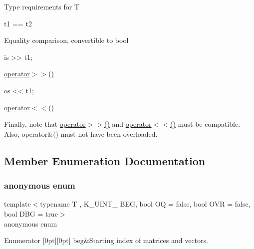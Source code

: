\begin{DoxyParagraph}{Type requirements for T}
\begin{DoxyItemize}
\item 
\begin{DoxyCode}
t1 == t2 
\end{DoxyCode}
 Equality comparison, convertible to {\ttfamily bool} 
\item 
\begin{DoxyCode}
is >> t1; 
\end{DoxyCode}
 {\ttfamily \mbox{\hyperlink{namespaceKalman_a72ce00e837fa126ab3961f879e3d8b87}{operator$>$$>$()}}} 
\item 
\begin{DoxyCode}
os << t1; 
\end{DoxyCode}
 {\ttfamily \mbox{\hyperlink{namespaceKalman_a531684dadbec9b34313492f6d5121598}{operator$<$$<$()}}} 
\end{DoxyItemize}
\end{DoxyParagraph}
Finally, note that {\ttfamily \mbox{\hyperlink{namespaceKalman_a72ce00e837fa126ab3961f879e3d8b87}{operator$>$$>$()}}} and {\ttfamily \mbox{\hyperlink{namespaceKalman_a531684dadbec9b34313492f6d5121598}{operator$<$$<$()}}} must be compatible. Also, {\ttfamily operator\&()} must not have been overloaded. 

\subsection{Member Enumeration Documentation}
\mbox{\label{classKalman_1_1EKFilter_a0665fa7fa760b5235cb556e2503ff687}} 
\subsubsection{\texorpdfstring{anonymous enum}{anonymous enum}}
{\footnotesize\ttfamily template$<$typename T , K\+\_\+\+U\+I\+N\+T\+\_ B\+EG, bool OQ = false, bool O\+VR = false, bool D\+BG = true$>$ \\
anonymous enum}

\begin{DoxyEnumFields}{Enumerator}
[0pt][0pt]{}\mbox{\label{classKalman_1_1EKFilter_a0665fa7fa760b5235cb556e2503ff687aa3adf9ec22ed3a246105276c85a146c1}} 
beg&Starting index of matrices and vectors. \\
\hline

\end{DoxyEnumFields}


